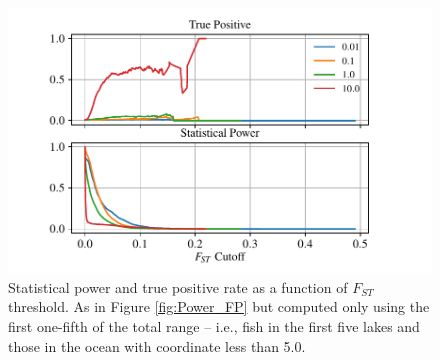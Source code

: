 \documentclass{article}
\begin{document}
\begin{figure}
    \begin{center}
        \includegraphics{Final_Plots/True_Power_0_5_500.pdf}
          \caption{ 
        Statistical power and true positive rate as a function of $F_{ST}$ threshold. As in Figure \ref{fig:Power_FP}
        but computed only using the first one-fifth of the total range -- i.e., fish in the first five lakes and those in the ocean with coordinate less than 5.0.
         	}
          \label{fig:Power_FP_5lakes}
    \end{center}
\end{figure}

\end{document}
